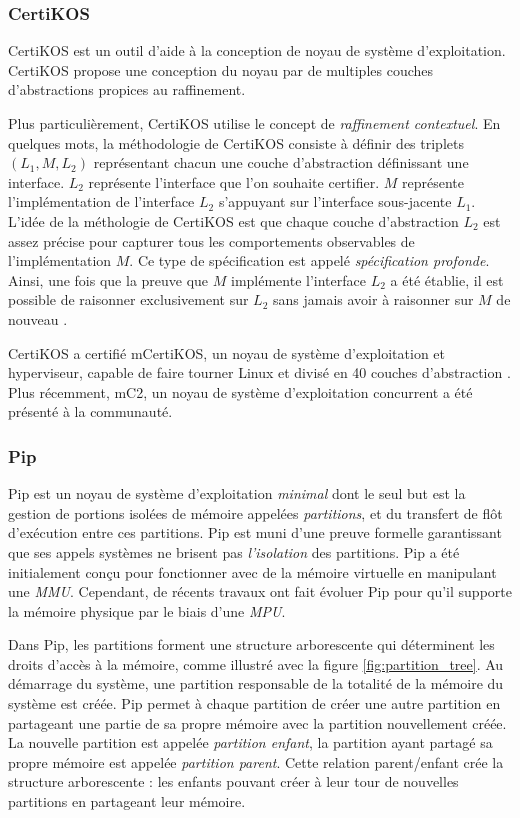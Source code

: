 			\subsubsection{CertiKOS}

	CertiKOS \cite{certikoswebsite} est un outil d'aide à la conception de noyau de système d'exploitation. CertiKOS propose une conception du noyau par de multiples couches d'abstractions propices au raffinement.

	Plus particulièrement, CertiKOS utilise le concept de \emph{raffinement contextuel}. En quelques mots, la méthodologie de CertiKOS consiste à définir des triplets $(L_1, M, L_2)$ représentant chacun une couche d'abstraction définissant une interface. $L_2$ représente l'interface que l'on souhaite certifier. $M$ représente l'implémentation de l'interface $L_2$ s'appuyant sur l'interface sous-jacente $L_1$. L'idée de la méthologie de CertiKOS est que chaque couche d'abstraction $L_2$ est assez précise pour capturer tous les comportements observables de l'implémentation $M$. Ce type de spécification est appelé \emph{spécification profonde}. Ainsi, une fois que la preuve que $M$ implémente l'interface $L_2$ a été établie, il est possible de raisonner exclusivement sur $L_2$ sans jamais avoir à raisonner sur $M$ de nouveau \cite{gu2015deep}.

	CertiKOS a certifié mCertiKOS, un noyau de système d'exploitation et hyperviseur, capable de faire tourner Linux et divisé en 40 couches d'abstraction \cite{gu2011certikos}. Plus récemment, mC2, un noyau de système d'exploitation concurrent \cite{concurrentcertikos, gu2016certikos} a été présenté à la communauté.

			\subsubsection{Pip}

	Pip est un noyau de système d'exploitation \emph{minimal} dont le seul but est la gestion de portions isolées de mémoire appelées \emph{partitions}, et du transfert de flôt d'exécution entre ces partitions. Pip est muni d'une preuve formelle garantissant que ses appels systèmes ne brisent pas \emph{l'isolation} des partitions. Pip a été initialement conçu pour fonctionner avec de la mémoire virtuelle en manipulant une \emph{MMU}. Cependant, de récents travaux ont fait évoluer Pip pour qu'il supporte la mémoire physique par le biais d'une \emph{MPU}.

	Dans Pip, les partitions forment une structure arborescente qui déterminent les droits d'accès à la mémoire, comme illustré avec la figure \ref{fig:partition_tree}. Au démarrage du système, une partition responsable de la totalité de la mémoire du système est créée. Pip permet à chaque partition de créer une autre partition en partageant une partie de sa propre mémoire avec la partition nouvellement créée. La nouvelle partition est appelée \emph{partition enfant}, la partition ayant partagé sa propre mémoire est appelée \emph{partition parent}. Cette relation parent/enfant crée la structure arborescente : les enfants pouvant créer à leur tour de nouvelles partitions en partageant leur mémoire.

